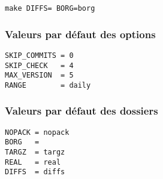 \documentclass[a4paper]{report}
\begin{document}
\begin{lstlisting}[language=Make]
make DIFFS= BORG=borg
\end{lstlisting}

\subsubsection{Valeurs par défaut des options}

\begin{lstlisting}[language=Make]
SKIP_COMMITS = 0
SKIP_CHECK   = 4
MAX_VERSION  = 5
RANGE        = daily
\end{lstlisting}

\subsubsection{Valeurs par défaut des dossiers}

\begin{lstlisting}[language=Make]
NOPACK = nopack
BORG   =
TARGZ  = targz
REAL   = real
DIFFS  = diffs
\end{lstlisting}
\end{document}
